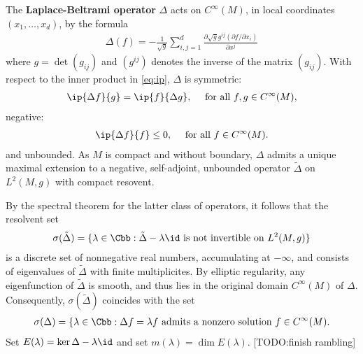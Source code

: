 The \textbf{Laplace-Beltrami operator} $\Delta$ acts on $C^\infty(M)$, in local coordinates $(x_1,\dots,x_d)$, by the formula
\begin{align}
  \Delta(f) = -\frac{1}{\sqrt{g}} \sum_{i,j=1}^d \frac{\partial \sqrt{g} g^{ij} (\partial f / \partial x_i)}{\partial x^j}
\end{align}
where $g = \det(g_{ij})$ and $(g^{ij})$ denotes the inverse of the matrix $(g_{ij})$. With respect to the inner product in \ref{eq:ip}, $\Delta$ is symmetric:
\begin{align*}
  \ip{\Delta f}{g} =\ip{ f}{\Delta g}, \quad \text{ for all $f,g \in C^\infty(M)$,}
\end{align*}
negative:
\begin{align*}
  \ip{\Delta f }{f} \leq 0, \quad \text{ for all $f \in C^\infty(M)$.}
\end{align*}
and unbounded. As $M$ is compact and without boundary, $\Delta$ admits a unique maximal extension to a negative, self-adjoint, unbounded operator  $\tilde{\Delta}$ on $L^2(M,g)$ with compact resovent.

By the spectral theorem for the latter class of operators, it follows that the resolvent set
\begin{align*}
  \sigma(\tilde{\Delta}) = \{ \lambda \in \Cbb : \tilde{\Delta} - \lambda \id \text{ is not invertible on $L^2(M,g)$}\}
\end{align*}
is a discrete set of nonnegative real numbers, accumulating at $-\infty$, and consists of eigenvalues of $\tilde{\Delta}$ with finite multiplicites. By elliptic regularity, any eigenfunction of $\tilde{\Delta}$ is smooth, and thus lies in the original domain $C^\infty(M)$ of $\Delta$. Consequently, $\sigma(\tilde{\Delta})$ coincides with the set
\begin{align*}
  \sigma(\Delta) = \{\lambda \in \Cbb : \Delta f  = \lambda f \text{ admits a nonzero  solution  $f \in C^\infty(M)$}.
\end{align*}
Set $E(\lambda) = \ker \Delta - \lambda \id$ and set $m(\lambda) = \dim E(\lambda)$. [TODO:finish rambling]














\newpage








